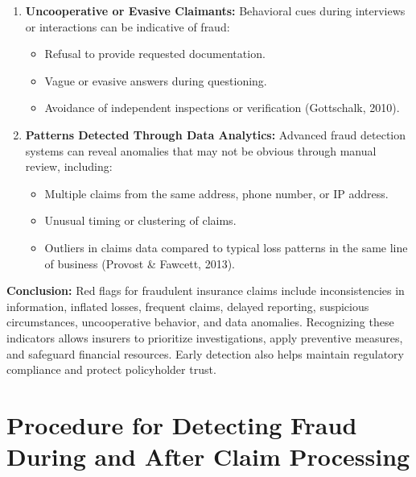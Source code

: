 \documentclass[12pt,a4paper]{article}
\begin{document}
\begin{enumerate}
\begin{itemize}
        \item Collusion between the claimant and service providers, such as repair shops or medical practitioners (Singleton \& Singleton, 2010).
    \end{itemize}
    \item \textbf{Uncooperative or Evasive Claimants:} Behavioral cues during interviews or interactions can be indicative of fraud:
    \begin{itemize}
        \item Refusal to provide requested documentation.
        \item Vague or evasive answers during questioning.
        \item Avoidance of independent inspections or verification (Gottschalk, 2010).
    \end{itemize}
    \item \textbf{Patterns Detected Through Data Analytics:} Advanced fraud detection systems can reveal anomalies that may not be obvious through manual review, including:
    \begin{itemize}
        \item Multiple claims from the same address, phone number, or IP address.
        \item Unusual timing or clustering of claims.
        \item Outliers in claims data compared to typical loss patterns in the same line of business (Provost \& Fawcett, 2013).
    \end{itemize}
\end{enumerate}

\begin{example}
\textbf{Conclusion:} Red flags for fraudulent insurance claims include inconsistencies in information, inflated losses, frequent claims, delayed reporting, suspicious circumstances, uncooperative behavior, and data anomalies. Recognizing these indicators allows insurers to prioritize investigations, apply preventive measures, and safeguard financial resources. Early detection also helps maintain regulatory compliance and protect policyholder trust.
\end{example}

\section{Procedure for Detecting Fraud During and After Claim Processing}
\end{document}

